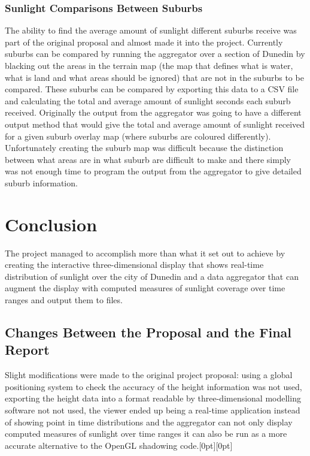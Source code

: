 \documentclass[12pt]{report}
\newcommand{\note}[1]{\raisebox{0pt}[0pt][0pt]{\pdfcomment[open=true]{#1}}}
\newcommand{\notedme}[1]{\note{#1}}
\begin{document}
\subsection{Sunlight Comparisons Between Suburbs}

The ability to find the average amount of sunlight different suburbs receive was part of the original proposal and almost made it into the project. Currently suburbs can be compared by running the aggregator over a section of Dunedin by blacking out the areas in the terrain map (the map that defines what is water, what is land and what areas should be ignored) that are not in the suburbs to be compared. These suburbs can be compared by exporting this data to a CSV file and calculating the total and average amount of sunlight seconds each suburb received. Originally the output from the aggregator was going to have a different output method that would give the total and average amount of sunlight received for a given suburb overlay map (where suburbs are coloured differently). Unfortunately creating the suburb map was difficult because the distinction between what areas are in what suburb are difficult to make and there simply was not enough time to program the output from the aggregator to give detailed suburb information.

\chapter{Conclusion}
The project managed to accomplish more than what it set out to achieve by creating the interactive three-dimensional display that shows real-time distribution of sunlight over the city of Dunedin and a data aggregator that can augment the display with computed measures of sunlight coverage over time ranges and output them to files. 

\section{Changes Between the Proposal and the Final Report}
Slight modifications were made to the original project proposal: using a global positioning system to check the accuracy of the height information was not used, exporting the height data into a format readable by three-dimensional modelling software not not used, the viewer ended up being a real-time application instead of showing point in time distributions and the aggregator can not only display computed measures of sunlight over time ranges it can also be run as a more accurate alternative to the OpenGL shadowing code.\notedme{Yep - good stuff! :-)}
\end{document}
